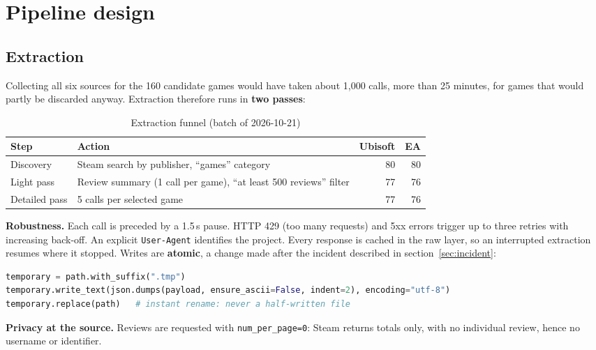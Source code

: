 \documentclass[11pt, a4paper, oneside, headings=normal, numbers=noenddot, DIV=12]{scrartcl}
\begin{document}
\section{Pipeline design}

\subsection{Extraction}
Collecting all six sources for the 160 candidate games would have taken about 1,000 calls, more than 25 minutes, for games that
would partly be discarded anyway. Extraction therefore runs in \textbf{two passes}:

\begin{table}[H]
\centering\small
\begin{tabularx}{\linewidth}{@{}l Y r r@{}}
\toprule
\textbf{Step} & \textbf{Action} & \textbf{Ubisoft} & \textbf{EA} \\
\midrule
Discovery & Steam search by publisher, ``games'' category & 80 & 80 \\
Light pass & Review summary (1 call per game), ``at least 500 reviews'' filter & 77 & 76 \\
Detailed pass & 5 calls per selected game & 77 & 76 \\
\bottomrule
\end{tabularx}
\caption{Extraction funnel (batch of 2026-10-21)}
\end{table}

\textbf{Robustness.} Each call is preceded by a 1.5\,s pause. HTTP 429 (too many requests) and 5xx errors trigger up to three
retries with increasing back-off. An explicit \texttt{User-Agent} identifies the project. Every response is cached in the raw layer,
so an interrupted extraction resumes where it stopped. Writes are \textbf{atomic}, a change made after the incident described in
section~\ref{sec:incident}:

\begin{lstlisting}[language=Python]
temporary = path.with_suffix(".tmp")
temporary.write_text(json.dumps(payload, ensure_ascii=False, indent=2), encoding="utf-8")
temporary.replace(path)   # instant rename: never a half-written file
\end{lstlisting}

\textbf{Privacy at the source.} Reviews are requested with \texttt{num\_per\_page=0}: Steam returns totals only, with no individual
review, hence no username or identifier.
\end{document}
